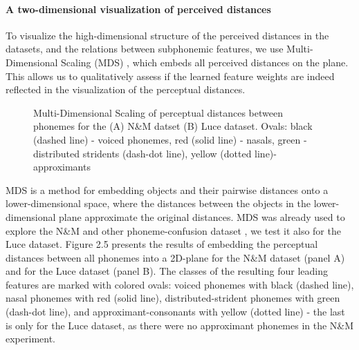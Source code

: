 \paragraph{A two-dimensional visualization of perceived distances} To visualize the high-dimensional structure of the perceived distances in the datasets, and the relations between subphonemic features, we use Multi-Dimensional Scaling (MDS) \citep{kruskal1964}, which embeds all perceived distances on the plane. This allows us to qualitatively assess if the learned feature weights are indeed reflected in the visualization of the perceptual distances.

\begin{figure}[t]
\caption{Multi-Dimensional Scaling of perceptual distances between phonemes for the  (A) N\&M datset (B) Luce dataset. Ovals: black (dashed line) - voiced phonemes, red (solid line) - nasals, green - distributed stridents (dash-dot line), yellow (dotted line)- approximants}
\end{figure}

MDS is a method for embedding objects and their pairwise distances onto a lower-dimensional space, where the distances between the objects in the lower-dimensional plane approximate the original distances. MDS was already used to explore the N\&M and other phoneme-confusion dataset \citep{Shepard1980, mielke2008emergence, Buchsbaum2015}, we test it also for the Luce dataset. Figure 2.5 presents the results of embedding the perceptual distances between all phonemes into a 2D-plane for the N\&M dataset (panel A) and for the Luce dataset (panel B). The classes of the resulting four leading features are marked with colored ovals: voiced phonemes with black (dashed line), nasal phonemes with red (solid line), distributed-strident phonemes with green (dash-dot line), and approximant-consonants with yellow (dotted line) - the last is only for the Luce dataset, as there were no approximant phonemes in the N\&M experiment. 

